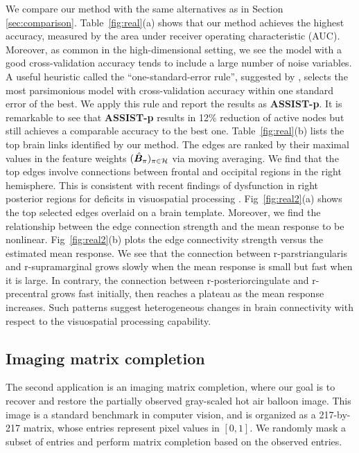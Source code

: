 \documentclass[aos]{imsart}
\theoremstyle{definition}
\begin{document}
We compare our method with the same alternatives as in Section \ref{sec:comparison}. Table~\ref{fig:real}(a) shows that our method achieves the highest accuracy, measured by the area under receiver operating characteristic (AUC). Moreover, as common in the high-dimensional setting, we see the model with a good cross-validation accuracy tends to include a large number of noise variables. A useful heuristic called the ``one-standard-error rule'', suggested by \cite{hastie2015statistical}, selects the most parsimonious model with cross-validation accuracy within one standard error of the best. We apply this rule and report the results as {\bf \footnotesize ASSIST-p}. It is remarkable to see that {\bf \footnotesize ASSIST-p} results in 12\% reduction of active nodes but still achieves a comparable accuracy to the best one. Table~\ref{fig:real}(b) lists the top brain links identified by our method. The edges are ranked by their maximal values in the feature weights $(\hat {\bm B}_\pi)_{\pi \in \mathcal{H}}$ via moving averaging. We find that the top edges involve connections between frontal and occipital regions in the right hemisphere. This is consistent with recent findings of dysfunction in right posterior regions for deficits in visuospatial processing \cite{wang2019common}. Fig~\ref{fig:real2}(a) shows the top selected edges overlaid on a brain template. Moreover, we find the relationship between the edge connection strength and the mean response to be nonlinear. Fig~\ref{fig:real2}(b) plots the edge connectivity strength versus the estimated mean response. We see that the connection between r-parstriangularis and r-supramarginal grows slowly when the mean response is small but fast when it is large. In contrary, the connection between r-posteriorcingulate and r-precentral  grows fast initially, then reaches a plateau as the mean response increases. Such patterns suggest heterogeneous changes in brain connectivity with respect to the visuospatial processing capability. 



\subsection{Imaging matrix completion}
\label{sec:completion}

The second application is an imaging matrix completion, where our goal is to recover and restore the partially observed gray-scaled hot air balloon image. This image is a standard benchmark in computer vision, and is organized as a 217-by-217 matrix, whose entries represent pixel values in $[0,1]$. We randomly mask a subset of entries and perform matrix completion based on the observed entries. 
\end{document}
